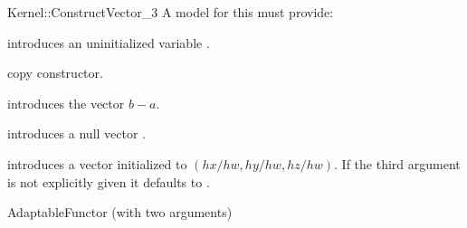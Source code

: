 \begin{ccRefFunctionObjectConcept}{Kernel::ConstructVector_3}
A model for this must provide:



\ccHidden{}
             {introduces an uninitialized variable .}

\ccHidden {}
            {copy constructor.}

            {introduces the vector $b-a$.}

            {introduces a null vector .}

\ccHidden{}
            {introduces a vector  initialized to $(hx/hw, hy/hw, hz/hw)$.
             If the third argument is not explicitly given it defaults
             to .}

\ccRefines
AdaptableFunctor (with two arguments)

\ccSeeAlso
{}\\

\end{ccRefFunctionObjectConcept}
